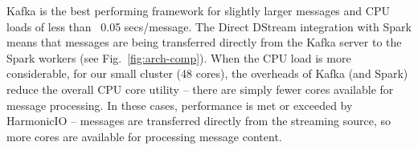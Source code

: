 \documentclass[conference]{IEEEtran}
\begin{document}
Kafka is the best performing framework for slightly larger messages and CPU loads of less than ~0.05 secs/message.
The Direct DStream integration with Spark means that messages are being transferred directly from the Kafka server to the Spark workers (see Fig.~\ref{fig:arch-comp}).  
When the CPU load is more considerable, for our small cluster (48 cores), the overheads of Kafka (and Spark) reduce the overall CPU core utility -- there are simply fewer cores available for message processing. %
In these cases, performance is met or exceeded by HarmonicIO -- messages are transferred directly from the streaming source, so more cores are available for processing message content.



\end{document}
